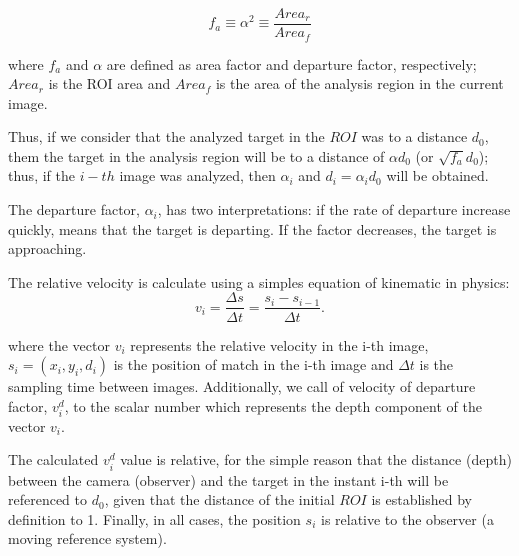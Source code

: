 \begin{equation}\label{eq:relarea}
f_a \equiv \alpha^2 \equiv \frac{Area_r}{Area_f} 
\end{equation}

where $f_a$ and $\alpha$ are defined as area factor and departure factor, 
respectively; $Area_r$ is the ROI area and $Area_f$ 
is the area of the analysis region in the current image. 

Thus, if we consider that the analyzed target  in the $ROI$ was to a distance $d_0$,
them the target in the analysis region will be to a distance of $\alpha d_0$ (or $\sqrt{f_a} d_0$);
thus, if the $i-th$ image was analyzed, then $\alpha_i$ and $d_i=\alpha_i d_0$ will be obtained.

The departure factor, $\alpha_i$, has two interpretations: if the rate of departure increase quickly, 
means that the target is departing. If the factor decreases, the 
target is approaching.

The relative velocity is calculate using a simples equation of kinematic in physics:
\begin{equation}
 v_i = \frac{\Delta s}{\Delta t}= \frac{s_i-s_{i-1}}{\Delta t}.
\end{equation}

where the vector $v_i$ represents the relative velocity in the i-th image, 
$s_i=(x_i,y_i,d_i)$ is the position of match in the i-th image
and $\Delta t$ is the sampling time between images.
Additionally, we call of velocity of departure factor, $v^d_i$, to 
the scalar number which represents the depth component
of the vector $v_i$.

The calculated  $v^d_i$ value is relative, for the simple reason that the distance (depth) between the 
camera (observer) and the target in the instant i-th will be referenced to $d_0$, 
given that the distance of the initial $ROI$ is established by definition to 1.
Finally, in all cases, the position $s_i$ is relative to the observer (a moving reference system).

